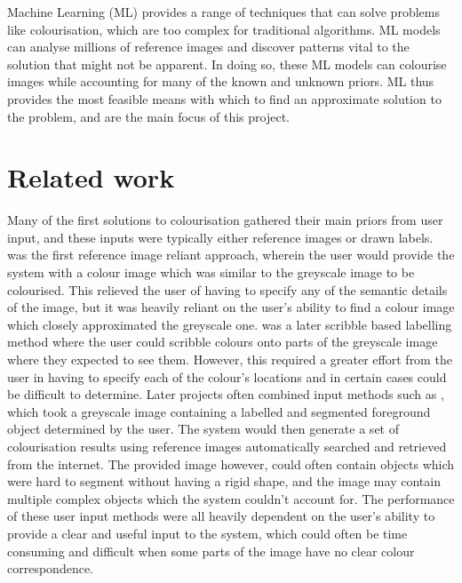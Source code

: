 \documentclass{l4proj}
\begin{document}
Machine Learning (ML) provides a range of techniques that can solve problems like colourisation, which are too complex for traditional algorithms. ML models can analyse millions of reference images and discover patterns vital to the solution that might not be apparent. In doing so, these ML models can colourise images while accounting for many of the known and unknown priors. ML thus provides the most feasible means with which to find an approximate solution to the problem, and are the main focus of this project. 

\section{Related work}
Many of the first solutions to colourisation gathered their main priors from user input, and these inputs were typically either reference images or drawn labels. \cite{TransferringColor} was the first reference image reliant approach, wherein the user would provide the system with a colour image which was similar to the greyscale image to be colourised. This relieved the user of having to specify any of the semantic details of the image, but it was heavily reliant on the user's ability to find a colour image which closely approximated the greyscale one. \cite{ColorizationOptimization} was a later scribble based labelling method where the user could scribble colours onto parts of the greyscale image where they expected to see them. However, this required a greater effort from the user in having to specify each of the colour's locations and in certain cases could be difficult to determine. Later projects often combined input methods such as \cite{SemanticColorization}, which took a greyscale image containing a labelled and segmented foreground object determined by the user. The system would then generate a set of colourisation results using reference images automatically searched and retrieved from the internet. The provided image however, could often contain objects which were hard to segment without having a rigid shape, and the image may contain multiple complex objects which the system couldn't account for. The performance of these user input methods were all heavily dependent on the user's ability to provide a clear and useful input to the system, which could often be time consuming and difficult when some parts of the image have no clear colour correspondence.
\end{document}
